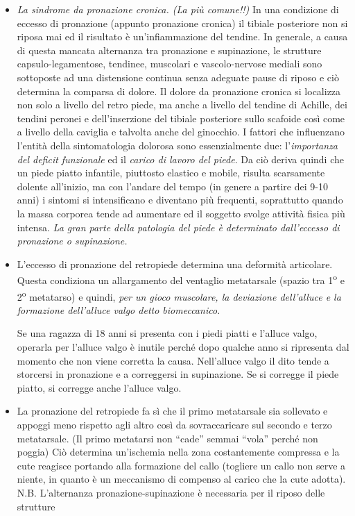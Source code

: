 \begin{itemize}
\item
  \emph{La sindrome da pronazione cronica. (La più comune!!)} In una condizione di eccesso di pronazione (appunto pronazione cronica) il tibiale posteriore non si riposa mai ed il risultato è un'infiammazione del tendine. In generale, a causa di questa mancata alternanza tra pronazione e supinazione, le strutture capsulo-legamentose, tendinee, muscolari e vascolo-nervose mediali sono sottoposte ad una distensione continua senza adeguate pause di riposo e ciò determina la comparsa di dolore. Il dolore da pronazione cronica si localizza non solo a livello del retro piede, ma anche a livello del tendine di Achille, dei tendini peronei e dell'inserzione del tibiale posteriore sullo scafoide così come a livello della caviglia e talvolta anche del ginocchio. I fattori che influenzano l'entità della sintomatologia dolorosa sono essenzialmente due: l'\emph{importanza del deficit funzionale} ed il \emph{carico di lavoro del piede}. Da ciò deriva quindi che un piede piatto infantile, piuttosto elastico e mobile, risulta scarsamente dolente all'inizio, ma con l'andare del tempo (in genere a partire dei 9-10 anni) i sintomi si intensificano e diventano più frequenti, soprattutto quando la massa corporea tende ad aumentare ed il soggetto svolge attività fisica più intensa.
\emph{La gran parte della patologia del piede è determinato dall'eccesso
di pronazione o supinazione.}

\item
  L'eccesso di pronazione del retropiede determina una deformità articolare. Questa condiziona un allargamento del ventaglio metatarsale (spazio tra 1\textsuperscript{o} e 2\textsuperscript{o} metatarso) e quindi, \emph{per un gioco muscolare, la deviazione dell'alluce e la formazione dell'alluce \emph{valgo} detto biomeccanico.}

Se una ragazza di 18 anni si presenta con i piedi piatti e l'alluce valgo, operarla per l'alluce valgo è inutile perché dopo qualche anno si ripresenta dal momento che non viene corretta la causa. Nell'alluce valgo il dito tende a storcersi in pronazione e a correggersi in supinazione. Se si corregge il piede piatto, si corregge anche l'alluce valgo.

\item
  La pronazione del retropiede fa sì che il primo metatarsale sia sollevato e appoggi meno rispetto agli altro così da sovraccaricare sul secondo e terzo metatarsale. (Il primo metatarsi non ``cade'' semmai ``vola'' perché non poggia) Ciò determina un'ischemia nella zona costantemente compressa e la cute reagisce portando alla formazione del callo (togliere un callo non serve a niente, in quanto è un meccanismo di compenso al carico che la cute adotta).
N.B. L'alternanza pronazione-supinazione è necessaria per il riposo delle strutture


\end{itemize}
